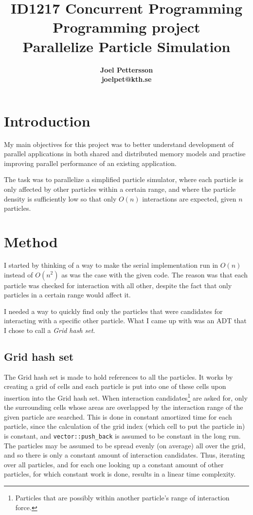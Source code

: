 \documentclass[12pt,a4paper]{article}
\title{
    {\normalsize\sc ID1217 Concurrent Programming} \\ 
    {\large Programming project} \\
    Parallelize Particle Simulation
}
\author{
    \bf Joel Pettersson \\
    \bf joelpet@kth.se \\
}
\begin{document}
\maketitle

\section{Introduction}

My main objectives for this project was to better understand development of
parallel applications in both shared and distributed memory models and practise
improving parallel performance of an existing application.

The task was to parallelize a simplified particle simulator, where each
particle is only affected by other particles within a certain range, and where
the particle density is sufficiently low so that only $O(n)$ interactions are
expected, given $n$ particles.

\section{Method}

I started by thinking of a way to make the serial implementation run in $O(n)$
instead of $O(n^2)$ as was the case with the given code. The reason was that
each particle was checked for interaction with all other, despite the fact that
only particles in a certain range would affect it. 

I needed a way to quickly find only the particles that were candidates for
interacting with a specific other particle. What I came up with was an ADT that
I chose to call a \emph{Grid hash set}.

\subsection{Grid hash set}

The Grid hash set is made to hold references to all the particles. It works by
creating a grid of cells and each particle is put into one of these cells upon
insertion into the Grid hash set. When interaction candidates\footnote{
Particles that are possibly within another particle's range of interaction
force.} are asked for, only the surrounding cells whose areas are overlapped by
the interaction range of the given particle are searched. This is done in
constant amortized time for each particle, since the calculation of the grid
index (which cell to put the particle in) is constant, and
\texttt{vector::push\_back} is assumed to be constant in the long run. The
particles may be assumed to be spread evenly (on average) all over the grid,
and so there is only a constant amount of interaction candidates. Thus,
iterating over all particles, and for each one looking up a constant amount of
other particles, for which constant work is done, results in a linear time
complexity.
\end{document}
